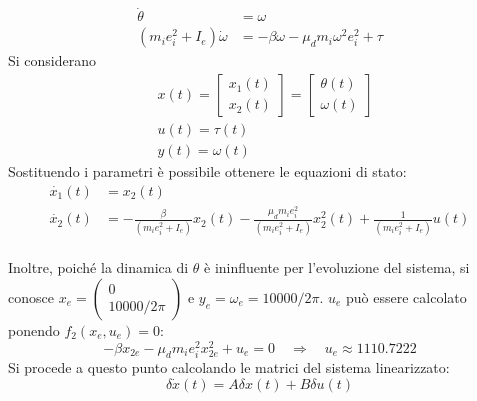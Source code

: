 \documentclass[a4paper,12pt,italian]{article}
\begin{document}
\begin{align*}
        \dot{\theta} &= \omega\\
        (m_i e_i^2 + I_e)\dot{\omega} &= -\beta \omega - \mu_d m_i \omega^2 e_i^2 + \tau
\end{align*}
Si considerano
\begin{align*}
    &x(t) =
    \begin{bmatrix}
        x_1(t)\\
        x_2(t)
    \end{bmatrix} =
    \begin{bmatrix}
        \theta(t)\\
        \omega(t)
    \end{bmatrix}\\
    &u(t) = \tau(t)\\
    &y(t) = \omega(t)
\end{align*}
Sostituendo i parametri è possibile ottenere le equazioni di stato:
\begin{equation*}
    \begin{aligned}
        \dot{x_1}(t) &= x_2(t)\\
        \dot{x_2}(t) &= -\frac{\beta}{(m_i e_i^2 + I_e)} x_2(t) - \frac{\mu_d m_i e_i^2}{(m_i e_i^2 + I_e)} x_2^2(t) + \frac{1}{(m_i e_i^2 + I_e)}u(t)
    \end{aligned}
\end{equation*} \\
Inoltre, poiché la dinamica di $\theta$ è ininfluente per l'evoluzione del sistema, si conosce $x_e = 
\begin{pmatrix}
    0\\
    10000/2\pi
\end{pmatrix}$
e $y_e = \omega_e = 10000/2\pi$.
$u_e$ può essere calcolato ponendo $f_2(x_e, u_e) = 0$:
\begin{equation*}
    -\beta x_{2e} - \mu_d m_i e_i^2 x_{2e}^2 + u_e = 0 \hspace{1em} \Longrightarrow \hspace{1em} u_e \approx 1110.7222
\end{equation*}
Si procede a questo punto calcolando le matrici del sistema linearizzato:
\begin{equation*}
    \delta \dot{x}(t) = A\delta x(t) + B\delta u(t)
\end{equation*}
\end{document}
